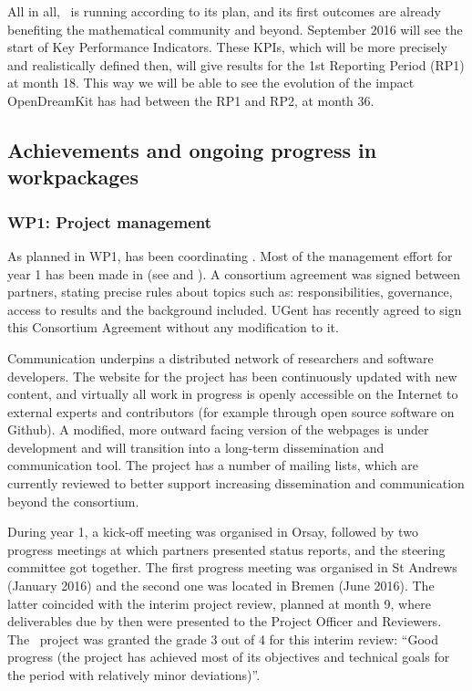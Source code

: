 \documentclass{deliverablereport}
\begin{document}
All in all, \ODK\ is running according to its plan, and its first
outcomes are already benefiting the mathematical community and
beyond. September 2016 will see the start of Key Performance
Indicators.  These KPIs, which will be more precisely and
realistically defined then, will give results for the 1st Reporting
Period (RP1) at month 18.  This way we will be able to see the
evolution of the impact OpenDreamKit has had between the RP1 and RP2,
at month 36.


\subsection{Achievements and ongoing progress in workpackages}

\subsubsection{WP1: Project management}

As planned in WP1,  has been coordinating \ODK.  Most of the
management effort for year 1 has been made in
 (see
 and
).  A consortium agreement was signed
between partners, stating precise rules about topics such as:
responsibilities, governance, access to results and the background
included. UGent has recently agreed to sign this Consortium Agreement
without any modification to it.

Communication underpins a distributed network of researchers and
software developers. The website for the project has been continuously
updated with new content, and virtually all work in progress is openly
accessible on the Internet to external experts and contributors (for
example through open source software on Github). A modified, more
outward facing version of the webpages is under development and will
transition into a long-term dissemination and communication tool.
The project has a number of mailing lists, which are currently
reviewed to better support increasing dissemination and communication
beyond the consortium.

During year 1, a kick-off meeting was organised in Orsay, followed by
two progress meetings at which partners presented status reports, and
the steering committee got together.  The first progress meeting was
organised in St Andrews (January 2016) and the second one was located
in Bremen (June 2016).  The latter coincided with the interim project
review, planned at month 9, where deliverables due by then were
presented to the Project Officer and Reviewers. The \ODK\ project was
granted the grade 3 out of 4 for this interim review: ``Good progress
(the project has achieved most of its objectives and technical goals
for the period with relatively minor deviations)''.
\end{document}
